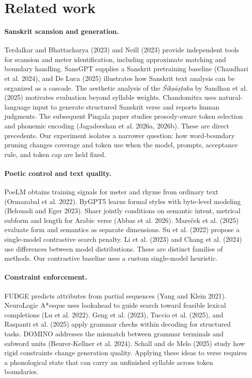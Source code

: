 \documentclass[11pt]{article}
\newcommand{\rtext}[1]{#1}
\begin{document}
\section{Related work}
\paragraph{Sanskrit scansion and generation.}
Terdalkar and Bhattacharya (2023) and Neill (2023) provide independent tools for scansion and meter identification, including approximate matching and boundary handling. SansGPT supplies a Sanskrit pretraining baseline (Chaudhari et al. 2024), and De Luca (2025) illustrates how Sanskrit text analysis can be organized as a cascade. The aesthetic analysis of the \rtext{\textit{Śikṣāṣṭaka}} by Sandhan et al. (2025) motivates evaluation beyond syllable weights. Chandomitra uses natural-language input to generate structured Sanskrit verse and reports human judgments. The subsequent Pingala paper studies prosody-aware token selection and phonemic encoding (Jagadeeshan et al. 2026a, 2026b). These are direct precedents. Our experiment isolates a narrower question: how word-boundary pruning changes coverage and token use when the model, prompts, acceptance rule, and token cap are held fixed.

\paragraph{Poetic control and text quality.}
PoeLM obtains training signals for meter and rhyme from ordinary text (Ormazabal et al. 2022). ByGPT5 learns formal styles with byte-level modeling (Belouadi and Eger 2023). Shaer jointly conditions on semantic intent, metrical subform and length for Arabic verse (Abbas et al. 2026). Mareček et al. (2025) evaluate form and semantics as separate dimensions. Su et al. (2022) propose a single-model contrastive search penalty. Li et al. (2023) and Chang et al. (2024) use differences between model distributions. These are distinct families of methods. Our contrastive baseline uses a custom single-model heuristic.

\paragraph{Constraint enforcement.}
FUDGE predicts attributes from partial sequences (Yang and Klein 2021). NeuroLogic A*esque uses lookahead to guide search toward feasible lexical completions (Lu et al. 2022). Geng et al. (2023), Tuccio et al. (2025), and Raspanti et al. (2025) apply grammar checks within decoding for structured tasks. DOMINO addresses the mismatch between grammar terminals and subword units (Beurer-Kellner et al. 2024). Schall and de Melo (2025) study how rigid constraints change generation quality. Applying these ideas to verse requires a phonological state that can carry an unfinished syllable across token boundaries.
\end{document}
